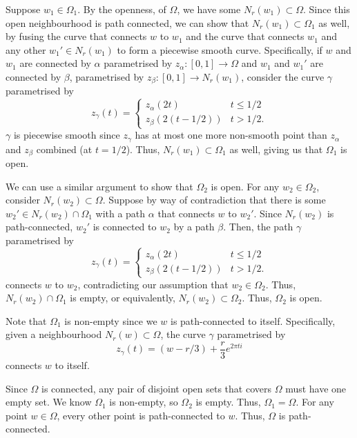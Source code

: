 \documentclass[12 pt, letterpaper]{hmcpset}
\begin{document}
\begin{solution}
\begin{enumerate}
			Suppose $w_{1} \in \Omega_{1}$. By the openness, of $\Omega$, we have some  $N_{r}(w_{1}) \subset \Omega$. Since this open neighbourhood is path connected, we can show that $N_{r}(w_{1}) \subset \Omega_{1}$ as well, by fusing the curve that connects $w$ to $w_{1}$ and the curve that connects $w_{1}$ and any other $w_{1}' \in N_{r}(w_{1})$ to form a piecewise smooth curve. Specifically, if $w$ and $w_{1}$ are connected by $\alpha$ parametrised by $z_{\alpha} : [0, 1] \to \Omega$ and $w_{1}$ and $w_{1}'$ are connected by $\beta$, parametrised by $z_{\beta} : [0, 1] \to N_{r}(w_{1})$, consider the curve $\gamma$ parametrised by
			\[
				z_{\gamma}(t) = \begin{cases}
					z_{\alpha}(2t) & t \le 1/2 \\
					z_{\beta}(2(t - 1/2)) & t > 1/2.
				\end{cases}
			\]
			$\gamma$ is piecewise smooth since $z_{\gamma}$ has at most one more non-smooth point than $z_{\alpha}$ and $z_{\beta}$ combined (at $t = 1/2$). Thus, $N_{r}(w_{1}) \subset \Omega_{1}$ as well, giving us that $\Omega_{1}$ is open.

			We can use a similar argument to show that $\Omega_{2}$ is open. For any $w_{2} \in \Omega_{2}$, consider $N_{r}(w_{2}) \subset \Omega$. Suppose by way of contradiction that there is some $w_{2}' \in N_{r}(w_{2}) \cap \Omega_{1}$ with a path $\alpha$ that connects $w$ to $w_{2}'$. Since $N_{r}(w_{2})$ is path-connected, $w_{2}'$ is connected to $w_{2}$ by a path $\beta$. Then, the path $\gamma$ parametrised by
			\[
				z_{\gamma}(t) = \begin{cases}
					z_{\alpha}(2t) & t \le 1/2 \\
					z_{\beta}(2(t - 1/2)) & t > 1/2.
				\end{cases}
			\]
			connects $w$ to $w_{2}$, contradicting our assumption that $w_{2} \in \Omega_{2}$. Thus, $N_{r}(w_{2}) \cap \Omega_{1}$ is empty, or equivalently, $N_{r}(w_{2}) \subset \Omega_{2}$. Thus, $\Omega_{2}$ is open.

			Note that $\Omega_{1}$ is non-empty since we $w$ is path-connected to itself. Specifically, given a neighbourhood $N_{r}(w) \subset \Omega$, the curve $\gamma$ parametrised by
			\[
				z_{\gamma}(t) = (w - r/3) + \frac{r}{3} e^{2 \pi t i}
			\]
			connects $w$ to itself.

			Since $\Omega$ is connected, any pair of disjoint open sets that covers $\Omega$ must have one empty set. We know $\Omega_{1}$ is non-empty, so $\Omega_{2}$ is empty. Thus, $\Omega_{1} = \Omega$. For any point $w \in \Omega$, every other point is path-connected to $w$. Thus, $\Omega$ is path-connected.
	\end{enumerate}
\end{solution}
\end{document}
